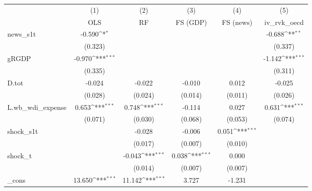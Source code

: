 {
\def\sym#1{\ifmmode^{#1}\else\(^{#1}\)\fi}
\begin{tabular}{l*{5}{c}}
\toprule
            &\multicolumn{1}{c}{(1)}&\multicolumn{1}{c}{(2)}&\multicolumn{1}{c}{(3)}&\multicolumn{1}{c}{(4)}&\multicolumn{1}{c}{(5)}\\
            &\multicolumn{1}{c}{OLS}&\multicolumn{1}{c}{RF}&\multicolumn{1}{c}{FS (GDP)}&\multicolumn{1}{c}{FS (news)}&\multicolumn{1}{c}{iv\_rvk\_oecd}\\
\midrule
news\_s1t    &      -0.590\sym{*}  &                     &                     &                     &      -0.688\sym{**} \\
            &     (0.323)         &                     &                     &                     &     (0.337)         \\
\addlinespace
gRGDP       &      -0.970\sym{***}&                     &                     &                     &      -1.142\sym{***}\\
            &     (0.335)         &                     &                     &                     &     (0.311)         \\
\addlinespace
D.tot       &      -0.024         &      -0.022         &      -0.010         &       0.012         &      -0.025         \\
            &     (0.028)         &     (0.024)         &     (0.014)         &     (0.011)         &     (0.026)         \\
\addlinespace
L.wb\_wdi\_expense&       0.653\sym{***}&       0.748\sym{***}&      -0.114         &       0.027         &       0.631\sym{***}\\
            &     (0.071)         &     (0.030)         &     (0.068)         &     (0.053)         &     (0.074)         \\
\addlinespace
shock\_s1t   &                     &      -0.028         &      -0.006         &       0.051\sym{***}&                     \\
            &                     &     (0.017)         &     (0.007)         &     (0.010)         &                     \\
\addlinespace
shock\_t     &                     &      -0.043\sym{***}&       0.038\sym{***}&       0.000         &                     \\
            &                     &     (0.014)         &     (0.007)         &     (0.007)         &                     \\
\addlinespace
\_cons      &      13.650\sym{***}&      11.142\sym{***}&       3.727         &      -1.231         &                     \\

\end{tabular}}
